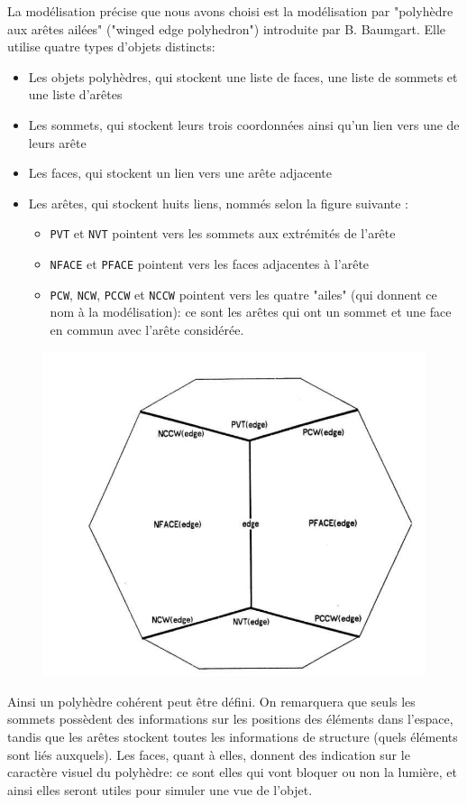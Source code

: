 \documentclass[a4paper]{article}
\begin{document}
      La modélisation précise que nous avons choisi est la modélisation par "polyhèdre aux arêtes ailées" ("winged edge polyhedron") introduite par B. Baumgart. Elle utilise quatre types d'objets distincts:
      \begin{itemize}
        \item Les objets polyhèdres, qui stockent une liste de faces, une liste de sommets et une liste d'arêtes
        \item Les sommets, qui stockent leurs trois coordonnées ainsi qu'un lien vers une de leurs arête
        \item Les faces, qui stockent un lien vers une arête adjacente
        \item Les arêtes, qui stockent huits liens, nommés selon la figure suivante :
        \begin{itemize}
          \item \texttt{PVT} et \texttt{NVT} pointent vers les sommets aux extrémités de l'arête
          \item \texttt{NFACE} et \texttt{PFACE} pointent vers les faces adjacentes à l'arête
          \item \texttt{PCW}, \texttt{NCW}, \texttt{PCCW} et \texttt{NCCW} pointent vers les quatre "ailes" (qui donnent ce nom à la modélisation): ce sont les arêtes qui ont un sommet et une face en commun avec l'arête considérée.
        \end{itemize}
      \end{itemize}

      \begin{figure}
        \includegraphics[width=0.5\linewidth]{WEP}
        \centering
      \end{figure}

      Ainsi un polyhèdre cohérent peut être défini. On remarquera que seuls les sommets possèdent des informations sur les positions des éléments dans l'espace, tandis que les arêtes stockent toutes les informations de structure (quels éléments sont liés auxquels). Les faces, quant à elles, donnent des indication sur le caractère visuel du polyhèdre: ce sont elles qui vont bloquer ou non la lumière, et ainsi elles seront utiles pour simuler une vue de l'objet.
\end{document}
